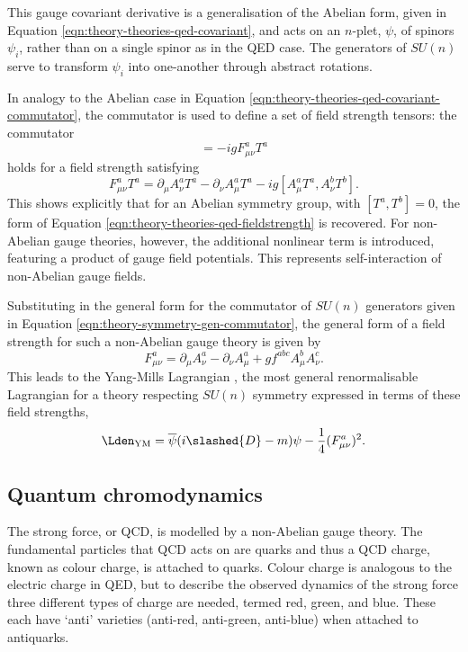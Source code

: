 This gauge covariant derivative is a generalisation of the Abelian form, given in
Equation \ref{eqn:theory-theories-qed-covariant}, and acts on an $n$-plet,
$\psi$, of spinors $\psi_i$, rather than on a single spinor as in the \ac{QED}
case. The generators of $SU(n)$ serve to transform $\psi_i$ into one-another
through abstract rotations.

In analogy to the Abelian case in Equation
\ref{eqn:theory-theories-qed-covariant-commutator}, the commutator is used to
define a set of field strength tensors: the commutator
\begin{equation*}
  [D_\mu, D_\nu] = -igF^a_{\mu\nu}T^a
\end{equation*}
holds for a field strength satisfying
\begin{equation*}
  F^a_{\mu\nu}T^a = \partial_\mu A^a_\nu T^a - \partial_\nu A^a_\mu T^a
                  - ig[A^a_\mu T^a, A^b_\nu T^b].
\end{equation*}
%
This shows explicitly that for an Abelian symmetry group, with $[T^a,T^b]=0$,
the form of Equation \ref{eqn:theory-theories-qed-fieldstrength} is recovered.
For non-Abelian gauge theories, however, the additional nonlinear term is
introduced, featuring a product of gauge field potentials.
This represents self-interaction of non-Abelian gauge fields.

Substituting in the general form for the commutator of $SU(n)$ generators given
in Equation \ref{eqn:theory-symmetry-gen-commutator}, the general form of a
field strength for such a non-Abelian gauge theory is given by
\begin{equation}
  F^a_{\mu\nu} = \partial_\mu A^a_\nu - \partial_\nu A^a_\mu
               + gf^{abc}A^b_\mu A^c_\nu.
  \label{eqn:theory-theories-ym-fieldstrength}
\end{equation}
%
This leads to the Yang-Mills Lagrangian \cite[pp.486-91]{Peskin1995}, the most
general renormalisable Lagrangian for a theory respecting $SU(n)$ symmetry
expressed in terms of these field strengths,
\begin{equation}
  \Lden_\text{YM} = \overline{\psi}(i\slashed{D} - m)\psi -\frac{1}{4} (F^a_{\mu\nu})^2.
  \label{eqn:theory-theories-ym-lagrangian}
\end{equation}


\subsection{Quantum chromodynamics}

The strong force, or \ac{QCD}, is modelled by a non-Abelian gauge theory. The
fundamental particles that \ac{QCD} acts on are quarks and thus
a \ac{QCD} charge, known as colour charge, is attached to quarks.
Colour charge is analogous to the electric charge in \ac{QED},
but to describe the observed dynamics of the strong force three different
types of charge are needed, termed red, green, and blue. These each have `anti'
varieties (anti-red, anti-green, anti-blue) when attached to antiquarks.

